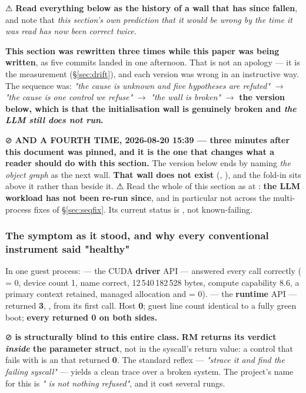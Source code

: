 \documentclass[10.5pt]{article}
\begin{document}
\begin{warnbox}
\smallskip
⚠ \textbf{Read everything below as the history of a wall that has since fallen}, and note that
\emph{this section's own prediction that it would be wrong by the time it was read has now been
correct twice.}
\end{warnbox}

\begin{claimbox}\small
\textbf{This section was rewritten three times while this paper was being written}, as five
commits landed in one afternoon. That is not an apology — it is the measurement
(\S\ref{sec:drift}), and each version was wrong in an instructive way. The sequence was:
\emph{"the cause is unknown and five hypotheses are refuted"} $\to$ \emph{"the cause is one
control we refuse"} $\to$ \emph{"the wall is broken"} $\to$ \textbf{the version below, which is
that the initialisation wall is genuinely broken and \emph{the LLM still does not run}.}

\smallskip
⊘ \textbf{AND A FOURTH TIME, 2026-08-20 15:39 --- three minutes after this document was pinned,
and it is the one that changes what a reader should do with this section.} The version below ends
by naming \emph{the object graph} as the next wall. \textbf{That wall does not exist}
(, ), and the fold-in sits above it rather than beside it. ⚠ Read
the whole of this section as \measured{} at : \textbf{the LLM workload has not
been re-run since}, and in particular not across the multi-process fixes of \S\ref{sec:seqfix}.
Its current status is \unver{}, not known-failing.
\end{claimbox}

\subsubsection*{The symptom as it stood, and why every conventional instrument said "healthy"}

In one guest process:  — the CUDA \textbf{driver} API — answered every call
correctly ( = 0, device count 1, name correct, 12\,540\,182\,528 bytes,
compute capability 8.6, a primary context retained, managed allocation and
 = 0).  — the \textbf{runtime} API — returned \textbf{3},
, from its first call. Host  \textbf{0}; guest
 line count identical to a fully green boot; \textbf{every  returned 0
on both sides.}

\begin{warnbox}\small
⊘ \textbf{ is structurally blind to this entire class.} \textbf{RM returns its
verdict \emph{inside} the parameter struct}, not in the syscall's return value: a control that
fails with  is an  that returned \textbf{0}. The
standard reflex — \emph{"strace it and find the failing syscall"} — yields a clean trace over a
broken system. The project's name for this is \emph{" is not \emph{nothing
refused}"}, and it cost several rungs.
\end{warnbox}
\end{document}
